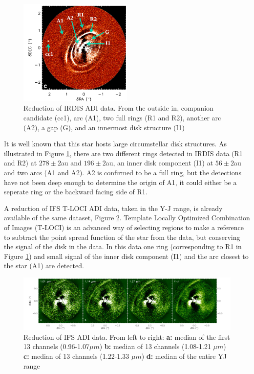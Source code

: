 \documentclass[twoside,single]{lion-msc}
\begin{document}
\begin{figure}
\includegraphics[width = 0.5\textwidth]{irdisjos}
\caption{Reduction of IRDIS ADI data. From the outside in, companion candidate (cc1), arc (A1), two full rings (R1 and R2), another arc (A2), a gap (G), and an innermost disk structure (I1)\citep{DeBoer2016}}
\label{fig:irdisjos}
\end{figure}

\noindent
It is well known that this star hosts large circumstellar disk structures.  As illustrated in Figure \ref{fig:irdisjos}, there are two different rings detected in IRDIS data (R1 and R2) at $278\pm 2$au and $196\pm 2$au, an inner disk component (I1) at $56\pm 2$au and two arcs (A1 and A2). A2 is confirmed to be a full ring, but the detections have not been deep enough to determine the origin of A1, it could either be a seperate ring or the backward facing side of R1. \citep{DeBoer2016}
\bigskip

A reduction of IFS T-LOCI ADI data, taken in the Y-J range, is already available of the same dataset, Figure \ref{fig:ifsjos}. Template Locally Optimized Combination of Images (T-LOCI) is an advanced way of selecting regions to make a reference to subtract the point spread function of the star from the data, but conserving the signal of the disk in the data. In this data one ring (corresponding to R1 in Figure \ref{fig:irdisjos}) and small signal of the inner disk component (I1) and the arc closest to the star (A1) are detected.

\begin{figure}[ht]
\includegraphics[width = \textwidth]{ifsjos}
\caption{Reduction of IFS ADI data. From left to right: \textbf{a:} median of the first 13 channels (0.96-1.07$\mu m$) \textbf{b:} median of 13 channels (1.08-1.21 $\mu m$) \textbf{c:} median of 13 channels (1.22-1.33 $\mu m$) \textbf{d:} median of the entire YJ range \citep{DeBoer2016}}
\label{fig:ifsjos}
\end{figure}
\end{document}
